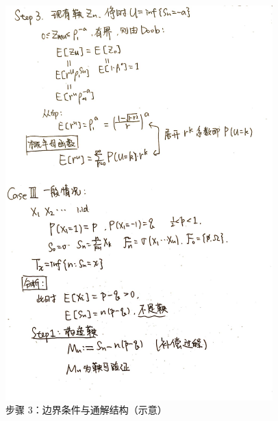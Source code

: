 \documentclass[12pt, a4paper, oneside, fontset=windows]{ctexbook}
\begin{document}
\begin{figure}[h]
	\centering
	\includegraphics[width=0.92\textwidth]{3.jpg}
	\caption{步骤 3：边界条件与通解结构（示意）}\label{fig:rw-step3}
\end{figure}
\end{document}
